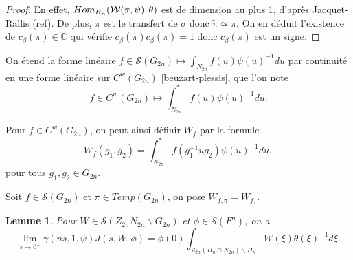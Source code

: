 \documentclass{amsart}
\newtheorem{lemme}{Lemme}[section]
\DeclareMathOperator{\Hom}{\mathnormal{Hom}}
\begin{document}
\begin{proof}
En effet, $\Hom_{H_n}(\mathcal{W}(\pi, \psi), \theta)$ est de dimension au plus 1, d'après Jacquet-Rallis (ref). De plus, $\pi$ est le transfert de $\sigma$ donc $\widetilde{\pi} \simeq \pi$. On en déduit l'existence de $c_\beta(\pi) \in \mathbb{C}$ qui vérifie $c_\beta(\widetilde{\pi})c_\beta(\pi) = 1$ donc $c_\beta(\pi)$ est un signe.
\end{proof}

On étend la forme linéaire $f \in \mathcal{S}(G_{2n}) \mapsto \int_{N_{2n}} f(u)\psi(u)^{-1} du$ par continuité en une forme linéaire sur $C^w(G_{2n})$ [beuzart-plessis], que l'on note
\begin{equation}
f \in C^w(G_{2n}) \mapsto \int_{N_{2n}}^* f(u)\psi(u)^{-1} du.
\end{equation}

Pour $f \in C^w(G_{2n})$, on peut ainsi définir $W_f$ par la formule
\begin{equation}
W_f(g_1, g_2) = \int_{N_{2n}}^* f(g_1^{-1}ug_2)\psi(u)^{-1} du,
\end{equation}
pour tous $g_1, g_2 \in G_{2n}$.

Soit $f \in \mathcal{S}(G_{2n})$ et $\pi \in Temp(G_{2n})$, on pose $W_{f, \pi} = W_{f_\pi}$.

\begin{lemme}
\label{limitezeta}
Pour $W \in \mathcal{S}(Z_{2n} N_{2n} \backslash G_{2n})$ et $\phi \in \mathcal{S}(F^n)$, on a
\begin{equation}
\lim_{s\rightarrow 0^+} \gamma(ns, 1, \psi) J(s, W, \phi) = \phi(0) \int_{Z_{2n}(H_n \cap N_{2n}) \backslash H_n} W(\xi) \theta(\xi)^{-1} d\xi.
\end{equation}
\end{lemme}
\end{document}
